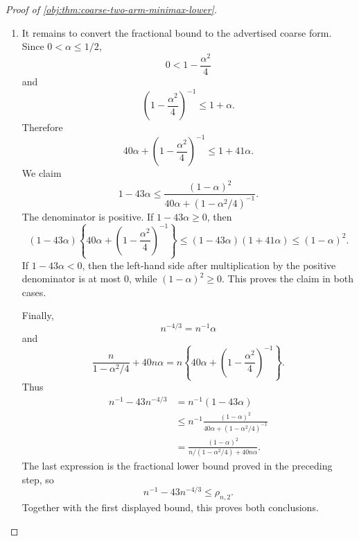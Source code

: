 \documentclass[11pt]{article}
\begin{document}
\begin{proof}[Proof of \cref{obj:thm:coarse-two-arm-minimax-lower}]
\begin{enumerate}
\item It remains to convert the fractional bound to the advertised coarse form. Since \(0<\alpha\le 1/2\),
\[
0<1-\frac{\alpha^2}{4}
\]
and
\[
\left(1-\frac{\alpha^2}{4}\right)^{-1}\le 1+\alpha.
\]
Therefore
\[
40\alpha+\left(1-\frac{\alpha^2}{4}\right)^{-1}
\le
1+41\alpha.
\]
We claim
\[
1-43\alpha
\le
\frac{(1-\alpha)^2}
{40\alpha+(1-\alpha^2/4)^{-1}}.
\]
The denominator is positive. If \(1-43\alpha\ge 0\), then
\[
(1-43\alpha)\left\{40\alpha+\left(1-\frac{\alpha^2}{4}\right)^{-1}\right\}
\le
(1-43\alpha)(1+41\alpha)
\le
(1-\alpha)^2.
\]
If \(1-43\alpha<0\), then the left-hand side after multiplication by the positive denominator is at most \(0\), while \((1-\alpha)^2\ge0\). This proves the claim in both cases.

Finally,
\[
n^{-4/3}=n^{-1}\alpha
\]
and
\[
\frac{n}{1-\alpha^2/4}+40n\alpha
=
n\left\{40\alpha+\left(1-\frac{\alpha^2}{4}\right)^{-1}\right\}.
\]
Thus
\[
\begin{aligned}
n^{-1}-43n^{-4/3}
&=
n^{-1}(1-43\alpha)\\
&\le
n^{-1}
\frac{(1-\alpha)^2}
{40\alpha+(1-\alpha^2/4)^{-1}}\\
&=
\frac{(1-\alpha)^2}
{n/(1-\alpha^2/4)+40n\alpha}.
\end{aligned}
\]
The last expression is the fractional lower bound proved in the preceding step, so
\[
n^{-1}-43n^{-4/3}\le \rho_{n,2}.
\]
Together with the first displayed bound, this proves both conclusions.
\end{enumerate}
\end{proof}
\end{document}
